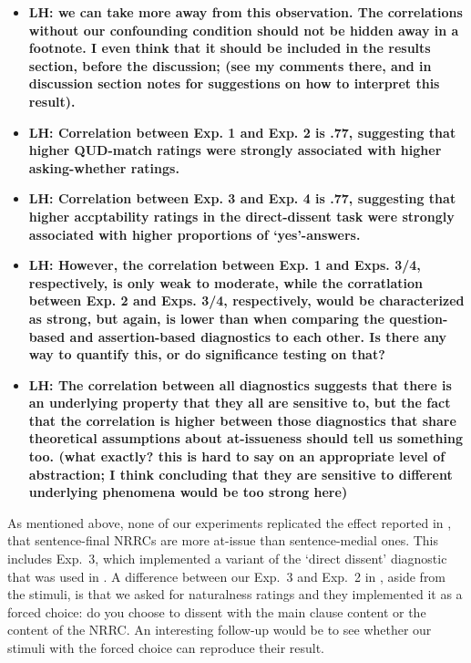 \documentclass[times,linguex,xcolor]{glossa}
\newcommand{\lh}[1]{\textbf{\color{Cerulean}LH: #1}}
\begin{document}
   \begin{itemize}
     \item \lh{we can take more away from this observation. The correlations without our confounding condition should not be hidden away in a footnote. I even think that it should be included in the results section, before the discussion; (see my comments there, and in discussion section notes for suggestions on how to interpret this result).}

     \item \lh{Correlation between Exp. 1 and Exp. 2 is .77, suggesting that higher QUD-match ratings were strongly associated with higher asking-whether ratings.}

     \item \lh{Correlation between Exp. 3 and Exp. 4 is .77, suggesting that higher accptability ratings in the direct-dissent task were strongly associated with higher proportions of `yes'-answers.}

     \item \lh{However, the correlation between Exp. 1 and Exps. 3/4, respectively, is only weak to moderate, while the corratlation between Exp. 2 and Exps. 3/4, respectively, would be characterized as strong, but again, is lower than when comparing the question-based and assertion-based diagnostics to each other. Is there any way to quantify this, or do significance testing on that?}

     \item \lh{The correlation between all diagnostics suggests that there is an underlying property that they all are sensitive to, but the fact that the correlation is higher between those diagnostics that share theoretical assumptions about at-issueness should tell us something too. (what exactly? this is hard to say on an appropriate level of abstraction; I think concluding that they are sensitive to different underlying phenomena would be too strong here)}

   \end{itemize}
   
  As mentioned above, none of our experiments replicated the effect reported in \citealt{syrett_experimental_2015}, that sentence-final NRRCs are more at-issue than sentence-medial ones. This includes Exp.~3, which implemented a variant of the `direct dissent' diagnostic that was used in \citealt{syrett_experimental_2015}. A difference between our Exp.~3 and Exp.~2 in \citealt{syrett_experimental_2015}, aside from the stimuli, is that we asked for naturalness ratings and they implemented it as a forced choice: do you choose to dissent with the main clause content or the content of the NRRC. An interesting follow-up would be to see whether our stimuli with the forced choice can reproduce their result.
\end{document}
